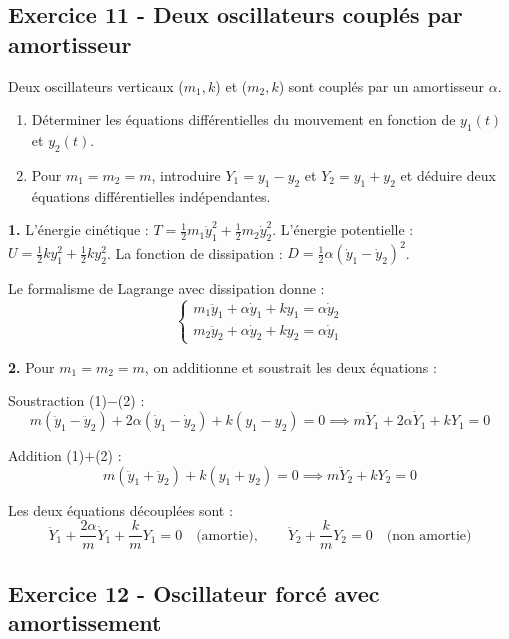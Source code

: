 \documentclass[12pt,a4paper]{article}
\begin{document}
\newpage

\subsection*{Exercice 11 - Deux oscillateurs couplés par amortisseur \niveau{\difficile}}

\begin{boiteexercice}
Deux oscillateurs verticaux ($m_1, k$) et ($m_2, k$) sont couplés par un amortisseur $\alpha$.
\begin{enumerate}
  \item Déterminer les équations différentielles du mouvement en fonction de $y_1(t)$ et $y_2(t)$.
  \item Pour $m_1 = m_2 = m$, introduire $Y_1 = y_1 - y_2$ et $Y_2 = y_1 + y_2$ et déduire deux équations différentielles indépendantes.
\end{enumerate}
\end{boiteexercice}

\begin{boitecorrige}
\textbf{1.} L'énergie cinétique : $T = \frac{1}{2}m_1\dot y_1^2 + \frac{1}{2}m_2\dot y_2^2$.
L'énergie potentielle : $U = \frac{1}{2}ky_1^2 + \frac{1}{2}ky_2^2$.
La fonction de dissipation : $D = \frac{1}{2}\alpha(\dot y_1-\dot y_2)^2$.

Le formalisme de Lagrange avec dissipation donne :
\[
\begin{cases}
m_1\ddot y_1 + \alpha\dot y_1 + ky_1 = \alpha\dot y_2 \\
m_2\ddot y_2 + \alpha\dot y_2 + ky_2 = \alpha\dot y_1
\end{cases}
\]

\textbf{2.} Pour $m_1=m_2=m$, on additionne et soustrait les deux équations :

Soustraction (1)$-$(2) :
\[
m(\ddot y_1-\ddot y_2) + 2\alpha(\dot y_1-\dot y_2) + k(y_1-y_2) = 0 \implies m\ddot Y_1 + 2\alpha\dot Y_1 + kY_1 = 0
\]

Addition (1)$+$(2) :
\[
m(\ddot y_1+\ddot y_2) + k(y_1+y_2) = 0 \implies m\ddot Y_2 + kY_2 = 0
\]

Les deux équations découplées sont :
\[
\ddot Y_1 + \frac{2\alpha}{m}\dot Y_1 + \frac{k}{m}Y_1 = 0 \quad\text{(amortie)}, \qquad \ddot Y_2 + \frac{k}{m}Y_2 = 0 \quad\text{(non amortie)}
\]
\end{boitecorrige}


\subsection*{Exercice 12 - Oscillateur forcé avec amortissement \niveau{\moyen}}
\end{document}
